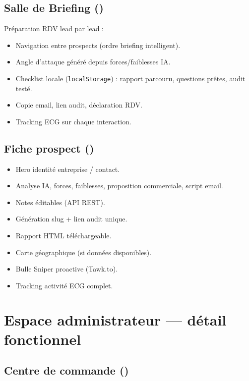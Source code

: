\documentclass[11pt,a4paper]{report}
\begin{document}
\section{Salle de Briefing ()}

Préparation RDV lead par lead :
\begin{itemize}[noitemsep]
  \item Navigation entre prospects (ordre briefing intelligent).
  \item Angle d'attaque généré depuis forces/faiblesses IA.
  \item Checklist locale (\texttt{localStorage}) : rapport parcouru, questions prêtes, audit testé.
  \item Copie email, lien audit, déclaration RDV.
  \item Tracking ECG sur chaque interaction.
\end{itemize}

\section{Fiche prospect ()}

\begin{itemize}[noitemsep]
  \item Hero identité entreprise / contact.
  \item Analyse IA, forces, faiblesses, proposition commerciale, script email.
  \item Notes éditables (API REST).
  \item Génération slug + lien audit unique.
  \item Rapport HTML téléchargeable.
  \item Carte géographique (si données disponibles).
  \item Bulle Sniper proactive (Tawk.to).
  \item Tracking activité ECG complet.
\end{itemize}

\chapter{Espace administrateur --- détail fonctionnel}

\section{Centre de commande ()}
\end{document}
